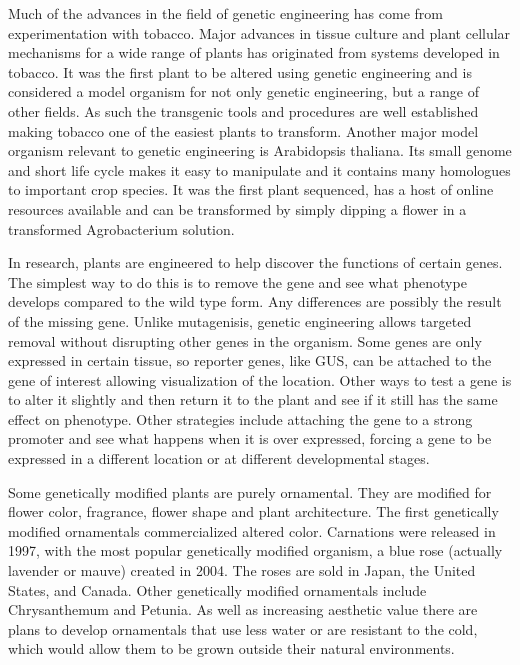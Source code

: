 Much of the advances in the field of genetic engineering has come from experimentation with tobacco. Major advances in tissue culture and plant cellular mechanisms for a wide range of plants has originated from systems developed in tobacco. It was the first plant to be altered using genetic engineering and is considered a model organism for not only genetic engineering, but a range of other fields. As such the transgenic tools and procedures are well established making tobacco one of the easiest plants to transform. Another major model organism relevant to genetic engineering is Arabidopsis thaliana. Its small genome and short life cycle makes it easy to manipulate and it contains many homologues to important crop species. It was the first plant sequenced, has a host of online resources available and can be transformed by simply dipping a flower in a transformed Agrobacterium solution.

In research, plants are engineered to help discover the functions of certain genes. The simplest way to do this is to remove the gene and see what phenotype develops compared to the wild type form. Any differences are possibly the result of the missing gene. Unlike mutagenisis, genetic engineering allows targeted removal without disrupting other genes in the organism. Some genes are only expressed in certain tissue, so reporter genes, like GUS, can be attached to the gene of interest allowing visualization of the location. Other ways to test a gene is to alter it slightly and then return it to the plant and see if it still has the same effect on phenotype. Other strategies include attaching the gene to a strong promoter and see what happens when it is over expressed, forcing a gene to be expressed in a different location or at different developmental stages.

Some genetically modified plants are purely ornamental. They are modified for flower color, fragrance, flower shape and plant architecture. The first genetically modified ornamentals commercialized altered color. Carnations were released in 1997, with the most popular genetically modified organism, a blue rose (actually lavender or mauve) created in 2004. The roses are sold in Japan, the United States, and Canada. Other genetically modified ornamentals include Chrysanthemum and Petunia. As well as increasing aesthetic value there are plans to develop ornamentals that use less water or are resistant to the cold, which would allow them to be grown outside their natural environments.

